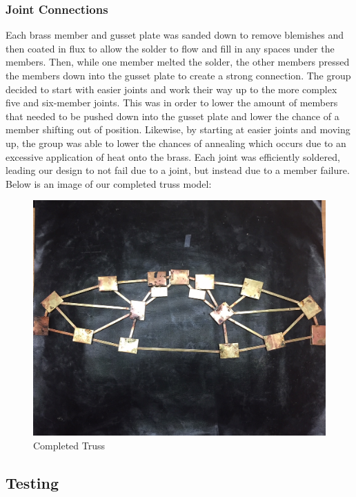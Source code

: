 \documentclass{article}
\begin{document}
\subsubsection{Joint Connections}
Each brass member and gusset plate was sanded down to remove blemishes and then coated in flux to allow the solder to flow and fill in any spaces under the members. Then, while one member melted the solder, the other members pressed the members down into the gusset plate to create a strong connection. The group decided to start with easier joints and work their way up to the more complex five and six-member joints. This was in order to lower the amount of members that needed to be pushed down into the gusset plate and lower the chance of a member shifting out of position. Likewise, by starting at easier joints and moving up, the group was able to lower the chances of annealing which occurs due to an excessive application of heat onto the brass. Each joint was efficiently soldered, leading our design to not fail due to a joint, but instead due to a member failure. Below is an image of our completed truss model:

\begin{figure}[ht]
\caption{Completed Truss}
\centering
\includegraphics[width=400pt]{BrassTruss.jpg}
\end{figure}

\newpage

\subsection{Testing}
\end{document}
